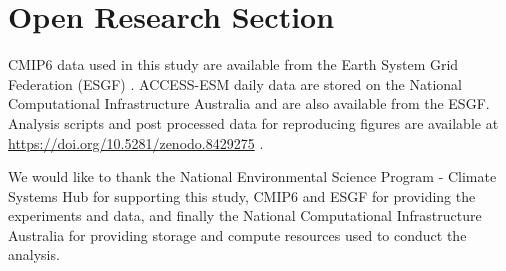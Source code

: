 \documentclass[draft]{agujournal2019}
\begin{document}
%
%

\section*{Open Research Section}
CMIP6 data used in this study are available from the Earth System Grid Federation (ESGF) \cite{cinquini_earth_2014}.
ACCESS-ESM daily data are stored on the National Computational Infrastructure Australia and are also available from the ESGF. Analysis scripts and post processed data for reproducing figures are available at \url{https://doi.org/10.5281/zenodo.8429275} \cite{loughran_tammasloughranafforestation_2023}.

\acknowledgments
We would like to thank the National Environmental Science Program - Climate Systems Hub for supporting this study, CMIP6 and ESGF for providing the experiments and data, and finally the National Computational Infrastructure Australia for providing storage and compute resources used to conduct the analysis.


%
%





%
%
%
%
%
\end{document}
